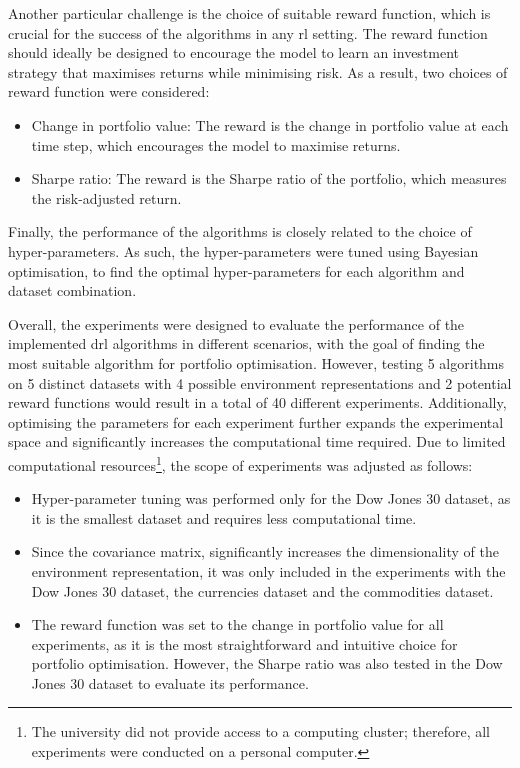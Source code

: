 Another particular challenge is the choice of suitable reward function, which is crucial for the success of the algorithms in any \acrshort{rl} setting. The reward function should ideally be designed to encourage the model to learn an investment strategy that maximises returns while minimising risk. As a result, two choices of reward function were considered:
\begin{itemize}
    \item Change in portfolio value: The reward is the change in portfolio value at each time step, which encourages the model to maximise returns.
    \item Sharpe ratio: The reward is the Sharpe ratio of the portfolio, which measures the risk-adjusted return.
\end{itemize}

Finally, the performance of the algorithms is closely related to the choice of hyper-parameters. As such, the hyper-parameters were tuned using Bayesian optimisation, to find the optimal hyper-parameters for each algorithm and dataset combination.

Overall, the experiments were designed to evaluate the performance of the implemented \acrshort{drl} algorithms in different scenarios, with the goal of finding the most suitable algorithm for portfolio optimisation. However, testing 5 algorithms on 5 distinct datasets with 4 possible environment representations and 2 potential reward functions would result in a total of 40 different experiments. Additionally, optimising the parameters for each experiment further expands the experimental space and significantly increases the computational time required. Due to limited computational resources\footnote{The university did not provide access to a computing cluster; therefore, all experiments were conducted on a personal computer.}, the scope of experiments was adjusted as follows:
\begin{itemize}
    \item Hyper-parameter tuning was performed only for the Dow Jones 30 dataset, as it is the smallest dataset and requires less computational time.
    \item Since the covariance matrix, significantly increases the dimensionality of the environment representation, it was only included in the experiments with the Dow Jones 30 dataset, the currencies dataset and the commodities dataset.
    \item The reward function was set to the change in portfolio value for all experiments, as it is the most straightforward and intuitive choice for portfolio optimisation. However, the Sharpe ratio was also tested in the Dow Jones 30 dataset to evaluate its performance.
\end{itemize}

